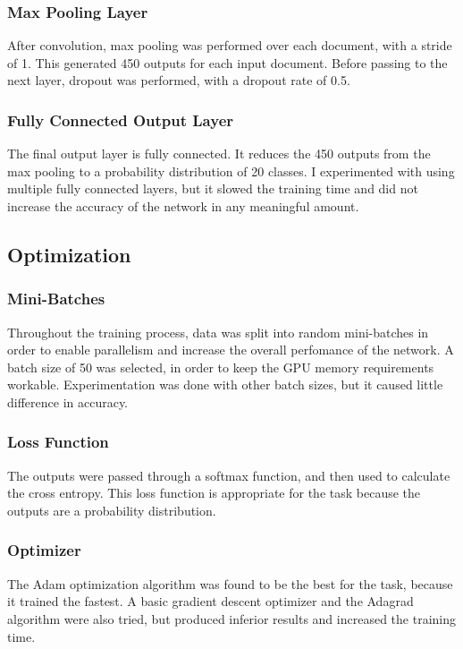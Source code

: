 \documentclass{article}
\begin{document}
\subsubsection{Max Pooling Layer}
After convolution, max pooling was performed over each document, with a stride of 1. This generated 450 outputs for each input document.
Before passing to the next layer, dropout was performed, with a dropout rate of 0.5.

\subsubsection{Fully Connected Output Layer}
The final output layer is fully connected. It reduces the 450 outputs from the max pooling to a probability distribution of 20 classes.
I experimented with using multiple fully connected layers, but it slowed the training time and did not increase the accuracy of the network
in any meaningful amount.

\subsection{Optimization}

\subsubsection{Mini-Batches}
Throughout the training process, data was split into random mini-batches in order to enable parallelism and increase the overall perfomance of
the network. A batch size of 50 was selected, in order to keep the GPU memory requirements workable. Experimentation was done with other batch
sizes, but it caused little difference in accuracy.

\subsubsection{Loss Function}
The outputs were passed through a softmax function, and then used to calculate the cross entropy. This loss function is appropriate for the
task because the outputs are a probability distribution.

\subsubsection{Optimizer}
The Adam optimization algorithm was found to be the best for the task, because it trained the fastest. A basic gradient descent optimizer and the Adagrad
algorithm were also tried, but produced inferior results and increased the training time.
\end{document}
